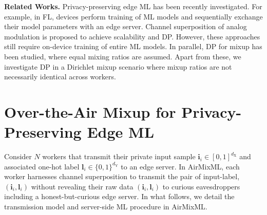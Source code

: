 \documentclass[conference,10pt]{IEEEtran}
\theoremstyle{definition}
\theoremstyle{definition}
\begin{document}
\vspace{.2em}\noindent\textbf{Related Works.}\quad
Privacy-preserving edge ML has been recently investigated.
For example, in FL\cite{mcmahan2016communication, mcmahan2021advances}, devices perform training of ML models and sequentially exchange their model parameters with an edge server.
Channel superposition of analog modulation is proposed to achieve scalability\cite{zhu2019broadband, yang2020federated, sery2020over, elgabli2020harnessing} and DP\cite{koda2020differentially, liu2020privacyforfree , elgabli2020harnessing}.
However, these approaches still require on-device training of entire ML models.
In parallel, DP for mixup has been studied\cite{lee2019synthesizing, borgnia2021dp}, where equal mixing ratios are assumed.
Apart from these, we investigate DP in a Dirichlet mixup scenario where mixup ratios
are not necessarily identical across workers.

\vspace{-0.3em}
\section{Over-the-Air Mixup for Privacy-Preserving Edge ML}
\label{sec:A_AirMixML}

Consider $N$ workers that transmit their private input sample $\bm{i}_i\in[0, 1]^{d_{\mathrm{X}}}$ and associated one-hot label $\bm{l}_i \in \{0, 1\}^{d_{\mathrm{Y}}}$ to an edge server.
In AirMixML, each worker harnesses channel superposition to transmit the pair of input-label, $(\bm{i}_i, \bm{l}_i)$ without revealing their raw data $(\bm{i}_i, \bm{l}_i)$ to curious eavesdroppers including a honest-but-curious edge server.
In what follows, we detail the transmission model and server-side ML procedure in AirMixML.
\end{document}
